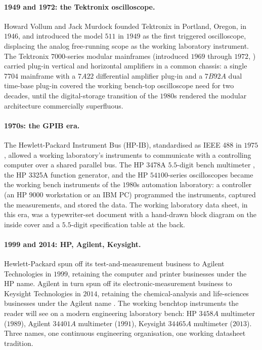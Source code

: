 \paragraph{1949 and 1972: the Tektronix oscilloscope.} Howard
Vollum and Jack Murdock founded Tektronix in Portland, Oregon, in
$1946$, and introduced the model $511$ in $1949$ as the first
triggered oscilloscope, displacing the analog free-running scope
as the working laboratory instrument. The Tektronix $7000$-series
modular mainframes (introduced $1969$ through $1972$,
\cite{web:ch05t3-tek-7000-history}) carried plug-in vertical and
horizontal amplifiers in a common chassis: a single $7704$
mainframe with a $7A22$ differential amplifier plug-in and a $7B92A$
dual time-base plug-in covered the working bench-top oscilloscope
need for two decades, until the digital-storage transition of the
$1980$s rendered the modular architecture commercially superfluous.

\paragraph{1970s: the GPIB era.} The Hewlett-Packard Instrument Bus
(HP-IB), standardised as IEEE 488 in $1975$
\cite{std:ch05t3-ieee-488-1975}, allowed a working laboratory's
instruments to communicate with a controlling computer over a
shared parallel bus. The HP 3478A $5.5$-digit bench multimeter
\cite{text:ch05t3-keysight-3478a-manual}, the HP 3325A
function generator, and the HP $54100$-series oscilloscopes
became the working bench instruments of the $1980$s automation
laboratory: a controller (an HP $9000$ workstation or an IBM PC)
programmed the instruments, captured the measurements, and stored
the data. The working laboratory data sheet, in this era, was a
typewriter-set document with a hand-drawn block diagram on the
inside cover and a $5.5$-digit specification table at the back.

\paragraph{1999 and 2014: HP, Agilent, Keysight.} Hewlett-Packard
spun off its test-and-measurement business to Agilent Technologies
in $1999$, retaining the computer and printer businesses under the
HP name. Agilent in turn spun off its electronic-measurement
business to Keysight Technologies in $2014$, retaining the
chemical-analysis and life-sciences businesses under the Agilent
name \cite{web:ch05t3-agilent-keysight-history}. The working
benchtop instruments the reader will see on a modern engineering
laboratory bench: HP $3458A$ multimeter ($1989$), Agilent
$34401A$ multimeter ($1991$), Keysight $34465A$ multimeter
($2013$). Three names, one continuous engineering organisation,
one working datasheet tradition.

